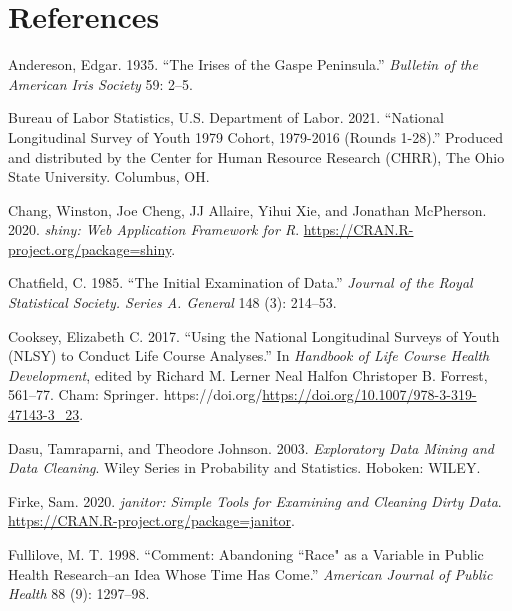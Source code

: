\documentclass{article}
\newlength{\cslhangindent}
\newlength{\cslentryspacingunit} %
\newenvironment{CSLReferences}[2] %
 {%
  \setlength{\parindent}{0pt}
  \ifodd #1
  \let\oldpar\par
  \def\par{\hangindent=\cslhangindent\oldpar}
  \fi
  \setlength{\parskip}{#2\cslentryspacingunit}
 }%
 {}
\begin{document}
\hypertarget{references}{%
\section*{References}\label{references}}

\hypertarget{refs}{}
\begin{CSLReferences}{1}{0}
\leavevmode{}%
Andereson, Edgar. 1935. {``The Irises of the Gaspe Peninsula.''} \emph{Bulletin of the American Iris Society} 59: 2--5.

\leavevmode{}%
Bureau of Labor Statistics, U.S. Department of Labor. 2021. {``National Longitudinal Survey of Youth 1979 Cohort, 1979-2016 (Rounds 1-28).''} Produced and distributed by the Center for Human Resource Research (CHRR), The Ohio State University. Columbus, OH.

\leavevmode{}%
Chang, Winston, Joe Cheng, JJ Allaire, Yihui Xie, and Jonathan McPherson. 2020. \emph{{shiny: Web Application Framework for R}}. \url{https://CRAN.R-project.org/package=shiny}.

\leavevmode{}%
Chatfield, C. 1985. {``The Initial Examination of Data.''} \emph{Journal of the Royal Statistical Society. Series A. General} 148 (3): 214--53.

\leavevmode{}%
Cooksey, Elizabeth C. 2017. {``Using the National Longitudinal Surveys of Youth (NLSY) to Conduct Life Course Analyses.''} In \emph{Handbook of Life Course Health Development}, edited by Richard M. Lerner Neal Halfon Christoper B. Forrest, 561--77. Cham: Springer. https://doi.org/\url{https://doi.org/10.1007/978-3-319-47143-3_23}.

\leavevmode{}%
Dasu, Tamraparni, and Theodore Johnson. 2003. \emph{Exploratory Data Mining and Data Cleaning}. Wiley Series in Probability and Statistics. Hoboken: WILEY.

\leavevmode{}%
Firke, Sam. 2020. \emph{{janitor: Simple Tools for Examining and Cleaning Dirty Data}}. \url{https://CRAN.R-project.org/package=janitor}.

\leavevmode{}%
Fullilove, M. T. 1998. {``Comment: Abandoning ``Race" as a Variable in Public Health Research--an Idea Whose Time Has Come.''} \emph{American Journal of Public Health} 88 (9): 1297--98.


\end{CSLReferences}
\end{document}
